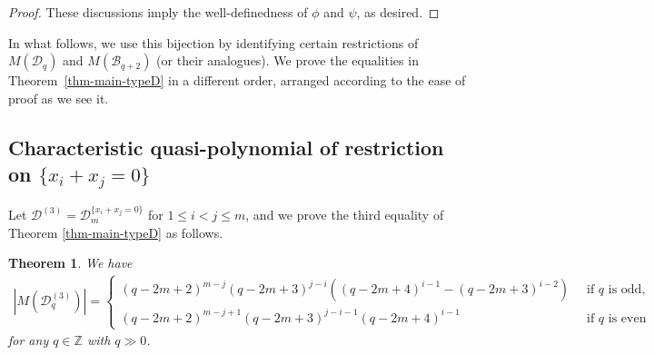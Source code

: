\documentclass{article}
\theoremstyle{plain}
\newtheorem{Them}{Theorem}[section]
\theoremstyle{definition}
\theoremstyle{remark}
\numberwithin{equation}{section}
\newcommand{\Bc}{\mathcal{B}}
\newcommand{\Dc}{\mathcal{D}}
\newcommand{\ZZ}{\mathbb{Z}}
\begin{document}
\begin{proof}
These discussions imply the well-definedness of $\phi$ and $\psi$, as desired. 
\end{proof}

In what follows, we use this bijection by identifying certain restrictions of $M(\Dc_q)$ and $M(\Bc_{q+2})$ (or their analogues). 
We prove the equalities in Theorem~\ref{thm-main-typeD} in a different order, arranged according to the ease of proof as we see it. 


\subsection{Characteristic quasi-polynomial of restriction on $\{x_i+x_j=0\}$}\label{sec-quasi-poly-restxi=-xj}
Let $\Dc^{(3)}=\Dc_m^{\{x_i+x_j=0\}}$ for $1\leq i<j \leq m$, and we prove the third equality of Theorem \ref{thm-main-typeD} as follows.
\begin{Them}\label{chara-quasi-del-by-xi=-xj}
We have
\begin{align*}
\left|M(\Dc^{(3)}_q)\right|=
\begin{cases}
    (q-2m+2)^{m-j}(q-2m+3)^{j-i}((q-2m+4)^{i-1}-(q-2m+3)^{i-2}) \;\;&\text{if $q$ is odd}, \\
    (q-2m+2)^{m-j+1}(q-2m+3)^{j-i-1}(q-2m+4)^{i-1} &\text{if $q$ is even} 
\end{cases}
\end{align*}
for any $q\in\ZZ$ with $q\gg 0$.
\end{Them}
\end{document}
